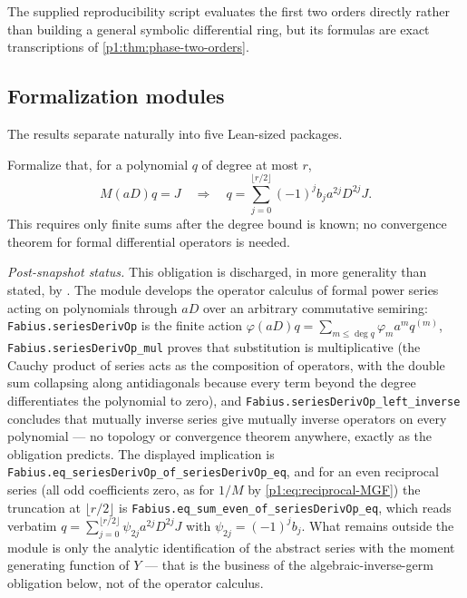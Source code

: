 \documentclass[11pt,oneside]{article}
\numberwithin{equation}{section}
\theoremstyle{definition}
\theoremstyle{remark}
\begin{document}
The supplied reproducibility script evaluates the first two orders directly rather than
building a general symbolic differential ring, but its formulas are exact transcriptions of
\cref{p1:thm:phase-two-orders}.

\subsection{Formalization modules}

The results separate naturally into five Lean-sized packages.

\begin{obligation}
Formalize that, for a polynomial $q$ of degree at most $r$,
\[
 M(aD)q=J \quad\Longrightarrow\quad
 q=\sum_{j=0}^{\lfloor r/2\rfloor}(-1)^jb_ja^{2j}D^{2j}J.
\]
This requires only finite sums after the degree bound is known; no convergence theorem for
formal differential operators is needed.
\end{obligation}

\emph{Post-snapshot status.}  This obligation is discharged, in more generality than
stated, by .  The module develops the operator
calculus of formal power series acting on polynomials through $aD$ over an arbitrary
commutative semiring: \nolinkurl{Fabius.seriesDerivOp} is the finite action
$\varphi(aD)q=\sum_{m\le\deg q}\varphi_m a^m q^{(m)}$,
\nolinkurl{Fabius.seriesDerivOp_mul} proves that substitution is multiplicative (the
Cauchy product of series acts as the composition of operators, with the double sum
collapsing along antidiagonals because every term beyond the degree differentiates the
polynomial to zero), and \nolinkurl{Fabius.seriesDerivOp_left_inverse} concludes that
mutually inverse series give mutually inverse operators on every polynomial --- no
topology or convergence theorem anywhere, exactly as the obligation predicts.  The
displayed implication is \nolinkurl{Fabius.eq_seriesDerivOp_of_seriesDerivOp_eq}, and
for an even reciprocal series (all odd coefficients zero, as for $1/M$ by
\eqref{p1:eq:reciprocal-MGF}) the truncation at $\lfloor r/2\rfloor$ is
\nolinkurl{Fabius.eq_sum_even_of_seriesDerivOp_eq}, which reads verbatim
$q=\sum_{j=0}^{\lfloor r/2\rfloor}\psi_{2j}a^{2j}D^{2j}J$ with
$\psi_{2j}=(-1)^jb_j$.  What remains outside the module is only the analytic
identification of the abstract series with the moment generating function of $Y$ ---
that is the business of the algebraic-inverse-germ obligation below, not of the
operator calculus.
\end{document}
